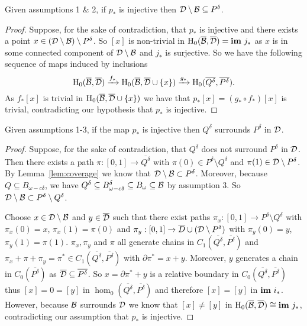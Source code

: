\begin{lemma}\label{lem:coverage}
    Given assumptions 1 \& 2, if $p_*$ is injective then ${\mathcal{D}}\setminus{\mathcal{B}}\subseteq P^\delta$.
\end{lemma}
\begin{proof}
    Suppose, for the sake of contradiction, that $p_*$ is injective and there exists a point $x\in ({\mathcal{D}}\setminus{\mathcal{B}})\setminus P^\delta$.
    So $[x]$ is non-trivial in $\mathrm{H}_0(\overline{{\mathcal{B}}},\overline{{\mathcal{D}}}) = \mathbf{im}~j_*$ as $x$ is in some connected component of ${\mathcal{D}}\setminus{\mathcal{B}}$ and $j_*$ is surjective.
    So we have the following sequence of maps induced by inclusions
    \[ \mathrm{H}_0(\overline{{\mathcal{B}}},\overline{{\mathcal{D}}})\xrightarrow{f_*} \mathrm{H}_0(\overline{{\mathcal{B}}},\overline{{\mathcal{D}}}\cup\{x\})\xrightarrow{g_*} \mathrm{H}_0(\overline{Q^\delta},\overline{P^\delta}).\]
    As $f_*[x]$ is trivial in $\mathrm{H}_0(\overline{{\mathcal{B}}},\overline{{\mathcal{D}}}\cup\{x\})$ we have that $p_*[x] = (g_*\circ f_*)[x]$ is trivial, contradicting our hypothesis that $p_*$ is injective.
\end{proof}

\begin{lemma}\label{lem:separate}
    Given assumptions 1-3, if the map $p_*$ is injective then $Q^\delta$ surrounds $P^\delta$ in ${\mathcal{D}}$.
\end{lemma}
\begin{proof}
    Suppose, for the sake of contradiction, that $Q^\delta$ does not surround $P^\delta$ in ${\mathcal{D}}$.
    Then there exists a path $\pi : [0,1]\to\overline{Q^\delta}$ with $\pi(0)\in P^\delta\setminus Q^\delta$ and $\pi(1)\in {\mathcal{D}}\setminus P^\delta$.
    By Lemma~\ref{lem:coverage} we know that ${\mathcal{D}}\setminus{\mathcal{B}}\subset P^\delta$.
    Moreover, because $Q\subseteq B_{\omega-c\delta}$, we have $Q^\delta\subseteq B^\delta_{\omega-c\delta}\subseteq B_\omega\subseteq {\mathcal{B}}$ by assumption 3.
    So ${\mathcal{D}}\setminus{\mathcal{B}}\subset P^\delta\setminus Q^\delta$.

    Choose $x\in{\mathcal{D}}\setminus {\mathcal{B}}$ and $y\in \overline{{\mathcal{D}}}$ such that there exist paths $\pi_x : [0,1]\to P^\delta\setminus Q^\delta$ with $\pi_x(0) = x$, $\pi_x(1) = \pi(0)$ and $\pi_y : [0,1]\to \overline{D}\cup ({\mathcal{D}}\setminus P^\delta)$ with $\pi_y(0) = y$, $\pi_y(1) = \pi(1)$.
    $\pi_x, \pi_y$ and $\pi$ all generate chains in $C_1(\overline{Q^\delta}, \overline{P^\delta})$ and $\pi_x + \pi + \pi_y = \pi^*\in C_1(\overline{Q^\delta}, \overline{P^\delta})$ with $\partial\pi^* = x + y$.
    Moreover, $y$ generates a chain in $C_0(\overline{P^\delta})$ as $\overline{{\mathcal{D}}}\subseteq\overline{P^\delta}$.
    So $x = \partial\pi^* + y$ is a relative boundary in $C_0(\overline{Q^\delta}, \overline{P^\delta})$ thus $[x] = 0 = [y]$ in $\hom_0(\overline{Q^\delta}, \overline{P^\delta})$ and therefore $[x] = [y]$ in $\mathbf{im}~i_*$.
    However, because ${\mathcal{B}}$ surrounds ${\mathcal{D}}$ we know that $[x]\neq [y]$ in $\mathrm{H}_0(\overline{{\mathcal{B}}}, \overline{{\mathcal{D}}})\cong \mathbf{im}~j_*$, contradicting our assumption that $p_*$ is injective.
\end{proof}

